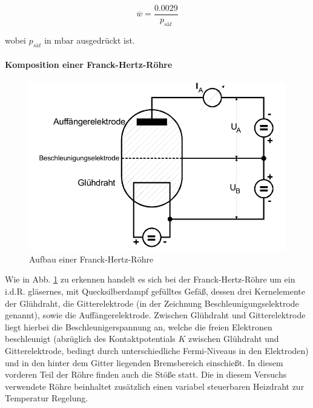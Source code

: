 \begin{equation}
  \label{eqn:Weg}
  \overline{w} = \frac{0.0029}{p_{sät}}
\end{equation}

wobei $p_{sät}$ in $\si{\milli \bar}$ ausgedrückt ist.

\paragraph{Komposition einer Franck-Hertz-Röhre}
\begin{figure}
  \center
  \includegraphics[width=\textwidth]{./logos/roehre.PNG}
  \caption{Aufbau einer Franck-Hertz-Röhre \cite{Anleitung}}
  \label{fig:roehre}
\end{figure}

Wie in Abb. \ref{fig:roehre} zu erkennen handelt es sich bei der Franck-Hertz-Röhre um ein i.d.R. gläsernes, mit Quecksilberdampf gefülltes Gefäß, dessen drei Kernelemente der Glühdraht, die Gitterelektrode (in der Zeichnung Beschleunigungselektrode genannt), sowie die Auffängerelektrode. Zwischen Glühdraht und Gitterelektrode liegt hierbei die Beschleunigerspannung an, welche die freien Elektronen beschleunigt (abzüglich des Kontaktpotentials $K$ zwischen Glühdraht und Gitterelektrode, bedingt durch unterschiedliche Fermi-Niveaus in den Elektroden) und in den hinter dem Gitter liegenden Bremsbereich einschießt. In diesem vorderen Teil der Röhre finden auch die Stöße statt. Die in diesem Versuchs verwendete Röhre beinhaltet zusätzlich einen variabel steuerbaren Heizdraht zur Temperatur Regelung.

